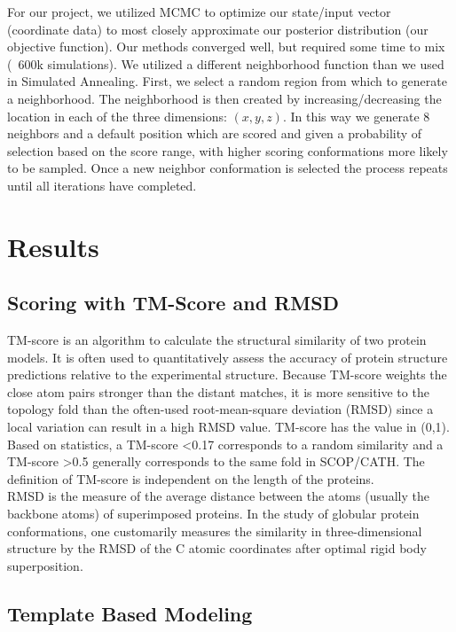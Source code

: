 \documentclass{article}
\begin{document}
For our project, we utilized MCMC to optimize our state/input vector (coordinate data) to most closely approximate our posterior distribution (our objective function).  Our methods converged well, but required some time to mix (~600k simulations).  We utilized a different neighborhood function than we used in Simulated Annealing.  First, we select a random region from which to generate a neighborhood. The neighborhood is then created by increasing/decreasing the location in each of the three dimensions: $(x, y, z)$. In this way we generate 8 neighbors and a default position which are scored and given a probability of selection based on the score range, with higher scoring conformations more likely to be sampled. Once a new neighbor conformation is selected the process repeats until all iterations have completed.


\section{Results}

\subsection{Scoring with TM-Score and RMSD}

TM-score is an algorithm to calculate the structural similarity of two protein models. It is often used to quantitatively assess the accuracy of protein structure predictions relative to the experimental structure. Because TM-score weights the close atom pairs stronger than the distant matches, it is more sensitive to the topology fold than the often-used root-mean-square deviation (RMSD) since a local variation can result in a high RMSD value. TM-score has the value in (0,1). Based on statistics, a TM-score <0.17 corresponds to a random similarity and a TM-score >0.5 generally corresponds to the same fold in SCOP/CATH. The definition of TM-score is independent on the length of the proteins.\\

RMSD is the measure of the average distance between the atoms (usually the backbone atoms) of superimposed proteins. In the study of globular protein conformations, one customarily measures the similarity in three-dimensional structure by the RMSD of the C atomic coordinates after optimal rigid body superposition.


\subsection{Template Based Modeling}
\end{document}
